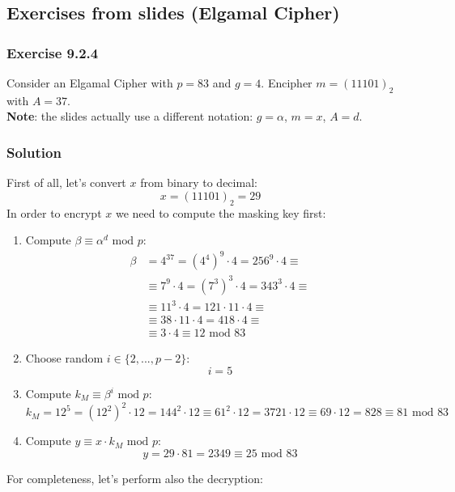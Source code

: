 \documentclass[11pt, a4paper]{article}
\newcommand{\mymod}{
    \text{ mod }
}
\begin{document}
\newpage
\subsection{Exercises from slides (Elgamal Cipher)}
\subsubsection{Exercise 9.2.4}
Consider an Elgamal Cipher with $p = 83$ and $g = 4$. Encipher $m = (11101)_2$ with $A = 37$.\\
\textbf{Note}: the slides actually use a different notation: $g=\alpha$, $m=x$, $A=d$.
\subsubsection*{Solution}
First of all, let's convert $x$ from binary to decimal:
$$x=(11101)_2=29$$
In order to encrypt $x$ we need to compute the masking key first:
\begin{enumerate}
    \item Compute $\beta\equiv\alpha^d\mymod p$:
    \begin{align*}
        \beta&=4^{37}=\left(4^4\right)^9\cdot4=256^9\cdot4\equiv\\
        &\equiv7^9\cdot4=\left(7^3\right)^3\cdot4=343^3\cdot4\equiv\\
        &\equiv11^3\cdot4=121\cdot11\cdot4\equiv\\
        &\equiv38\cdot11\cdot4=418\cdot4\equiv\\
        &\equiv3\cdot4\equiv12\mymod83
    \end{align*}
    \item Choose random $i\in\{2,...,p-2\}$:
    $$i=5$$
    \item Compute $k_M\equiv\beta^i\mymod p$:    $$k_M=12^5=\left(12^2\right)^2\cdot12=144^2\cdot12\equiv61^2\cdot12=3721\cdot12\equiv69\cdot12=828\equiv81\mymod83$$
    \item Compute $y\equiv x\cdot k_M\mymod p$:
    $$y=29\cdot81=2349\equiv25\mymod83$$
\end{enumerate}
For completeness, let's perform also the decryption:
\end{document}
